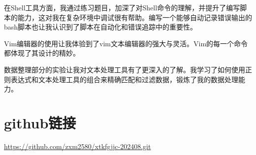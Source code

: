 \documentclass[a4paper, 12pt]{article}
\begin{document}
	在Shell工具方面，我通过练习题目，加深了对Shell命令的理解，并提升了编写脚本的能力，这对我在复杂环境中调试很有帮助。编写一个能够自动记录错误输出的bash脚本也让我认识到了脚本在自动化和错误追踪中的重要性。
	
	Vim编辑器的使用让我体验到了vim文本编辑器的强大与灵活。Vim的每一个命令都体现了其设计的精妙。
	
	数据整理部分的实验让我对文本处理工具有了更深入的了解。我学习了如何使用正则表达式和文本处理工具的组合来精确匹配和过滤数据，锻炼了我的数据处理能力。
	
	\section{github链接}
	\underline{https://github.com/zxm2580/xtkfgjjc-202408.git}	
	
\end{document}
